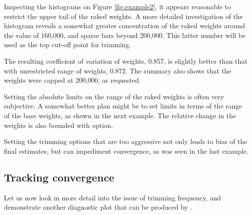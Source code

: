 \begin{stexample}[Example 3]

Inspecting the histograms on Figure \ref{fig:example2}, it appears reasonable
to restrict the upper tail of the raked weights. A more detailed investigation
of the histogram reveals a somewhat greater concentration of the raked weights
around the value of 160,000, and sparse bars beyond 200,000. This latter number
will be used as the top cut-off point for trimming.

\begin{stlog}
\nullskip
\end{stlog}

The resulting coefficient of variation of weights, 0.857, is slightly
better than that with unrestricted range of weights, 0.872. The summary also shows
that the weights were capped at 200,000, as requested.

Setting the absolute limits on the range of the raked weights is often
very subjective. A somewhat better plan might be to set limits in terms
of the range of the base weights, as shown in the next example. The relative
change in the weights is also bounded with  option.

\begin{stlog}
\nullskip
\end{stlog}

\end{stexample}

Setting the trimming options that are too aggressive not only leads
to bias of the final estimates, but can impediment convergence, as was
seen in the last example.

\subsection{Tracking convergence}
\label{subsec:example:trace}

Let us now look in more detail into the issue of trimming frequency,
and demonstrate another diagnostic plot that can be produced by
.

